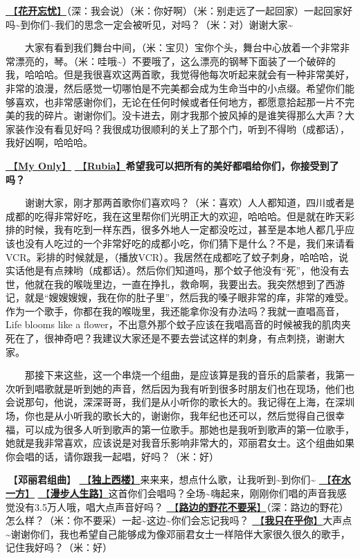 \documentclass[]{ctexbook}
\begin{document}
\hyperref[no-worries]{🎵【\textbf{花开忘忧}】}（深：我会说）（米：你好啊）（米：别走远了一起回家）一起回家好吗\textasciitilde 到你们\textasciitilde 我们的思念一定会被听见，对吗？（米：对）谢谢大家\textasciitilde{}

  大家有看到我们舞台中间，（米：宝贝）宝你个头，舞台中心放着一个非常非常漂亮的，琴。（米：哇哦\textasciitilde）不要哦了，这么漂亮的钢琴下面装了一个破碎的我，哈哈哈。但是我很喜欢这两首歌，我觉得他每次听起来就会有一种非常美好，非常的浪漫，然后感觉一切哪怕是不完美都会成为生命当中的小点缀。希望你们能够喜欢，也非常感谢你们，无论在任何时候或者任何地方，都愿意拾起那一片不完美的我的碎片。谢谢你们。没卡进去，刚才我那个披风掉的是谁笑得那么大声？大家装作没有看见好吗？我很成功很顺利的关上了那个门，听到不得哟（成都话），我好凶啊，哈哈哈。

\hyperref[my-only]{🎵【\textbf{My Only}】} \hyperref[rubia]{🎵【\textbf{Rubia}】}\textbf{希望我可以把所有的美好都唱给你们，你接受到了吗？}

  谢谢大家，刚才那两首歌你们喜欢吗？（米：喜欢）人人都知道，四川或者是成都的吃得非常好吃，我在这里帮你们光明正大的欢迎，哈哈哈。但是就在昨天彩排的时候，我有吃到一样东西，很多外地人一定都没吃过，甚至是本地人都几乎应该也没有人吃过的一个非常好吃的成都小吃，你们猜下是什么？不是，我们来请看VCR。彩排的时候就是，（播放VCR）。我居然在成都吃了蚊子刺身，哈哈哈，说实话他是有点辣哟（成都话）。然后你们知道吗，那个蚊子他没有``死''，他没有去世，他就在我的喉咙里边，一直在挣扎，救命啊，我要出去。我突然想到了西游记，就是``嫂嫂嫂嫂，我在你的肚子里''，然后我的嗓子眼非常的痒，非常的难受。作为一个歌手，你都在我的喉咙里，我还能拿你没有办法吗？我就一直唱高音，Life blooms like a flower，不出意外那个蚊子应该在我唱高音的时候被我的肌肉夹死在了，很神奇吧？我建议大家还是不要去尝试这样的刺身，有点刺挠，谢谢大家。

  那接下来这些，这一个串烧一个组曲，是应该算是我的音乐的启蒙者，我第一次听到唱歌就是听到她的声音，然后因为我有听到很多时朋友们也在现场，他们也会说那句，他说，深深哥哥，我们是从小听你的歌长大的。我记得在上海，在深圳场，你也是从小听我的歌长大的，谢谢你，我年纪也还可以，然后觉得自己很幸福，可以成为很多人听到歌声的第一位歌手。那她也是我听到歌声的第一位歌手，她就是我非常喜欢，应该说是对我音乐影响非常大的，邓丽君女士。这个组曲如果你会唱的话，请你跟我一起唱，好吗？（米：好）

🎵【\textbf{邓丽君组曲}】
\hyperref[one-in-the-building]{🎵【\textbf{独上西楼}】}来来来，想点什么歌，让我听到\textasciitilde 到你们\textasciitilde{}
\hyperref[on-the-water-side]{🎵【\textbf{在水一方}】}
\hyperref[walk-the-road-of-life]{🎵【\textbf{漫步人生路}】}这首你们会唱吗？全场\textasciitilde 嗨起来，刚刚你们唱的声音我感觉没有3.5万人哦，唱大点声音好吗？
\hyperref[only-with-me]{🎵【\textbf{路边的野花不要采}】}（深：路边的野花）怎么样？（米：你不要采）一起\textasciitilde 这边\textasciitilde 你们会忘记我吗？
\hyperref[only-you]{🎵【\textbf{我只在乎你}】}大声点\textasciitilde 谢谢你们，我也希望自己能够成为像邓丽君女士一样陪伴大家很久很久的歌手，记住我好吗？（米：好）
\end{document}
